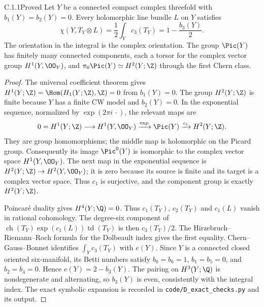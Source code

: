\begin{idstatement}{C.1.1}{Proved}\label{st:C.1.1}
Let $Y$ be a connected compact complex threefold with
$b_1(Y)=b_2(Y)=0$. Every holomorphic line bundle $L$ on $Y$ satisfies
\[
 \chi(Y,T_Y\otimes L)=\frac12\int_Yc_3(T_Y)
 =1-\frac{b_3(Y)}2.
\]
The orientation in the integral is the complex orientation. The group
$\Pic(Y)$ has finitely many connected components, each a torsor for the
complex vector group $H^1(Y,\OO_Y)$, and
$\pi_0\Pic(Y)\simeq H^2(Y;\Z)$ through the first Chern class.
\end{idstatement}
\begin{proof}
The universal coefficient theorem gives
$H^1(Y;\Z)=\Hom(H_1(Y;\Z),\Z)=0$ from $b_1(Y)=0$.
The group $H^2(Y;\Z)$ is finite because $Y$ has a finite CW model and
$b_2(Y)=0$. In the exponential sequence, normalized by
$\exp(2\pi i\,\cdot)$, the relevant maps are
\[
0=H^1(Y;\Z)\longrightarrow H^1(Y,\OO_Y)
 \xrightarrow{\exp} \Pic(Y)
 \xrightarrow{c_1} H^2(Y;\Z).
\]
They are group homomorphisms; the middle map is holomorphic on the
Picard group. Consequently its image $\Pic^0(Y)$ is isomorphic to the
complex vector space $H^1(Y,\OO_Y)$. The next map in the exponential
sequence is $H^2(Y;\Z)\to H^2(Y,\OO_Y)$; it is zero because its
source is finite and its target is a complex vector space. Thus
$c_1$ is surjective, and the component group is exactly $H^2(Y;\Z)$.

Poincar\'e duality gives $H^4(Y;\Q)=0$. Thus
$c_1(T_Y)$, $c_2(T_Y)$ and $c_1(L)$ vanish in rational cohomology.
The degree-six component of
$\operatorname{ch}(T_Y)\exp(c_1(L))\operatorname{td}(T_Y)$ is then
$c_3(T_Y)/2$. The Hirzebruch--Riemann--Roch formula for the Dolbeault
index gives the first equality. Chern--Gauss--Bonnet identifies
$\int_Yc_3(T_Y)$ with $e(Y)$. Since $Y$ is a connected closed oriented
six-manifold, its Betti numbers satisfy
$b_0=b_6=1$, $b_1=b_5=0$, and $b_2=b_4=0$. Hence
$e(Y)=2-b_3(Y)$. The pairing on $H^3(Y;\Q)$ is nondegenerate and
alternating, so $b_3(Y)$ is even, consistently with the integral index.
The exact symbolic expansion is recorded in
\texttt{code/D\_exact\_checks.py} and its output.
\end{proof}



